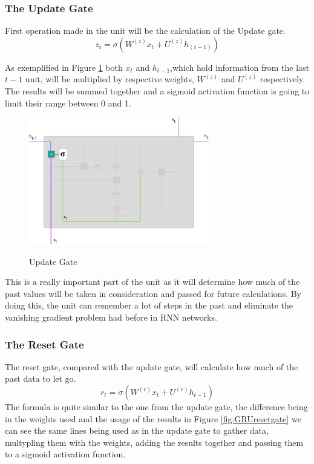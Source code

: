 \subsubsection{The Update Gate}

First operation made in the unit will be the calculation of the Update gate.
\begin{equation}
  z_t =\sigma(W^{(z)}x_t + U^{(z)}h_{(t-1)})
\end{equation}

As exemplified in Figure \ref{fig:GRUupdategate} both $x_t$ and $h_{t-1}$,which hold information from the last $t-1$ unit, will be multiplied by respective weights, $W^{(z)}$ and $U^{(z)}$ respectively. The results will be summed together and a sigmoid activation function is going to limit their range between 0 and 1.

\begin{figure}[htp]
	\centering
	\includegraphics[width=0.7\textwidth]{Illustrations/GRUupdategate.png}
	\caption{Update Gate}\cite{GRUPHOTOS}
	\label{fig:GRUupdategate}
\end{figure}

This is a really important part of the unit as it will determine how much of the past values will be taken in consideration and passed for future calculations. By doing this, the unit can remember a lot of steps in the past and eliminate the vanishing gradient problem had before in RNN networks.
\subsubsection{The Reset Gate}
The reset gate, compared with the update gate, will calculate how much of the past data to let go.
\begin{equation}
r_t=\sigma(W^{(r)}x_t+U^{(r)}h_{t-1})
\end{equation}
The formula is quite similar to the one from the update gate, the difference being in the weights used and the usage of the results in Figure \ref{fig:GRUresetgate} we can see the same lines being used as in the update gate to gather data, multypling them with the weights, adding the results together and passing them to a sigmoid activation function.


